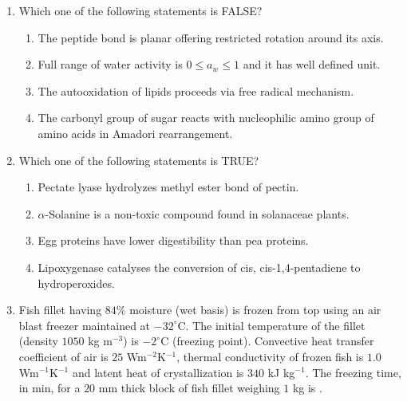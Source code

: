 \documentclass[a4paper,10pt]{article}
\begin{document}
\begin{enumerate}
    \hfill{}
    \begin{enumerate}[label=\Alph*)]
    \end{enumerate}
    
    \item Which one of the following statements is FALSE?
    
    \hfill{}
    \begin{enumerate}[label=\Alph*)]
        \item The peptide bond is planar offering restricted rotation around its axis.
        \item Full range of water activity is $0 \le a_w \le 1$ and it has well defined unit.
        \item The autooxidation of lipids proceeds via free radical mechanism.
        \item The carbonyl group of sugar reacts with nucleophilic amino group of amino acids in Amadori rearrangement.
    \end{enumerate}
    
    \item Which one of the following statements is TRUE?
    
    \hfill{}
    \begin{enumerate}[label=\Alph*)]
        \item Pectate lyase hydrolyzes methyl ester bond of pectin.
        \item $\alpha$-Solanine is a non-toxic compound found in solanaceae plants.
        \item Egg proteins have lower digestibility than pea proteins.
        \item Lipoxygenase catalyses the conversion of cis, cis-1,4-pentadiene to hydroperoxides.
    \end{enumerate}
    
    \item Fish fillet having $84\%$ moisture (wet basis) is frozen from top using an air blast freezer maintained at $-32^\circ$C. The initial temperature of the fillet (density $1050$ kg m$^{-3}$) is $-2^\circ$C (freezing point). Convective heat transfer coefficient of air is $25$ Wm$^{-2}$K$^{-1}$, thermal conductivity of frozen fish is $1.0$ Wm$^{-1}$K$^{-1}$ and latent heat of crystallization is $340$ kJ kg$^{-1}$. The freezing time, in min, for a $20$ mm thick block of fish fillet weighing $1$ kg is \underline{\hspace{2cm}}.
    

\end{enumerate}
\end{document}
